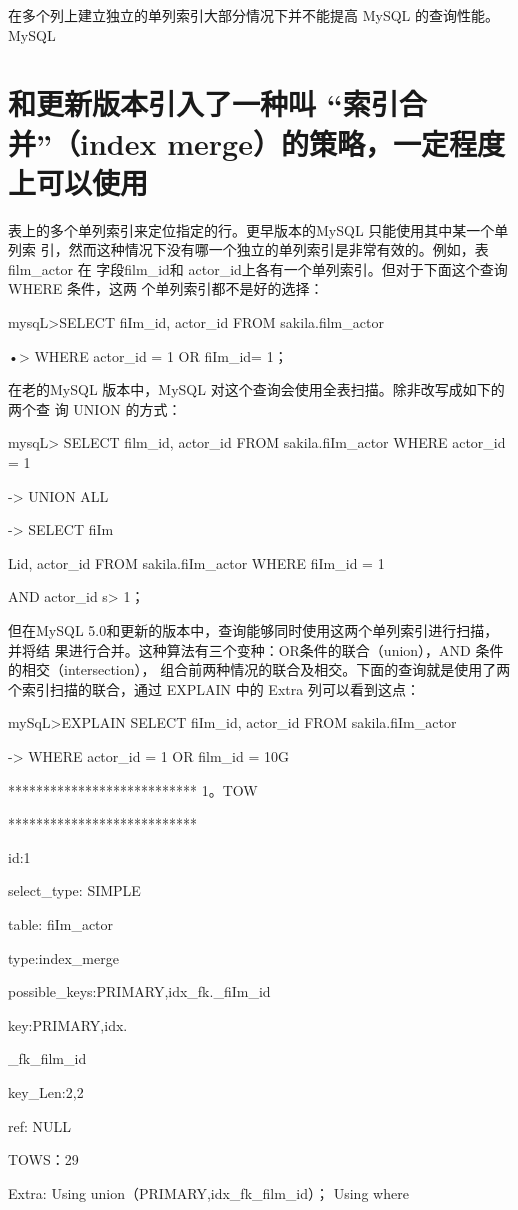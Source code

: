 在多个列上建立独立的单列索引大部分情况下并不能提高 MySQL 的查询性能。MySQL
\section{和更新版本引入了一种叫 “索引合并”（index merge）的策略，一定程度上可以使用}表上的多个单列索引来定位指定的行。更早版本的MySQL 只能使用其中某一个单列索
引，然而这种情况下没有哪一个独立的单列索引是非常有效的。例如，表film\_actor 在
字段film\_id和 actor\_id上各有一个单列索引。但对于下面这个查询 WHERE 条件，这两
个单列索引都不是好的选择：

mysqL>SELECT fiIm\_id, actor\_id FROM sakila.film\_actor

•> WHERE actor\_id = 1 OR fiIm\_id= 1；

在老的MySQL 版本中，MySQL 对这个查询会使用全表扫描。除非改写成如下的两个查
询 UNION 的方式：

mysqL> SELECT film\_id, actor\_id FROM sakila.fiIm\_actor WHERE actor\_id = 1

-> UNION ALL

-> SELECT fiIm

Lid, actor\_id FROM sakila.fiIm\_actor WHERE fiIm\_id = 1

AND actor\_id s> 1；

但在MySQL 5.0和更新的版本中，查询能够同时使用这两个单列索引进行扫描，并将结
果进行合并。这种算法有三个变种：OR条件的联合（union），AND 条件的相交（intersection），
组合前两种情况的联合及相交。下面的查询就是使用了两个索引扫描的联合，通过
EXPLAIN 中的 Extra 列可以看到这点：

mySqL>EXPLAIN SELECT fiIm\_id, actor\_id FROM sakila.fiIm\_actor

-> WHERE actor\_id = 1 OR film\_id = 10G

*************************** 1。TOW

***************************

id:1

select\_type: SIMPLE

table: fiIm\_actor

type:index\_merge

possible\_keys:PRIMARY,idx\_fk.\_fiIm\_id

key:PRIMARY,idx.

\_fk\_film\_id

key\_Len:2,2

ref: NULL

TOWS：29

Extra: Using union（PRIMARY,idx\_fk\_film\_id）； Using where


